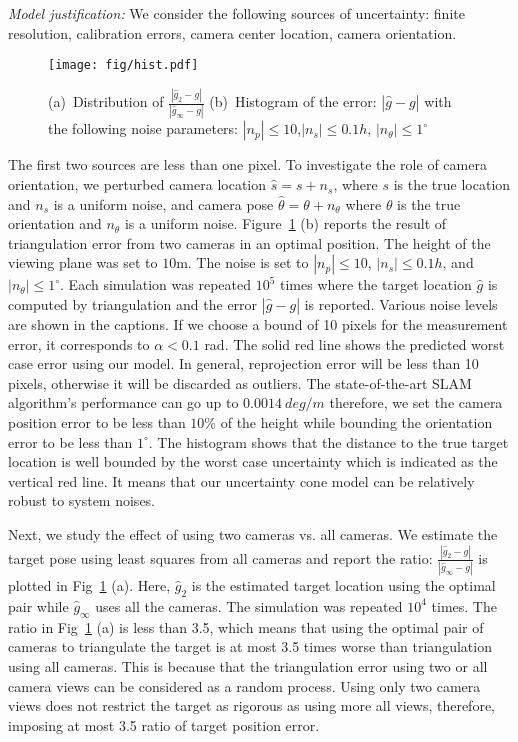 {\em Model justification:}
We consider the following sources of uncertainty: finite resolution, calibration errors, camera center location, camera orientation.

\begin{figure}
\centering
	\texttt{[image: fig/hist.pdf]}
	\caption{(a)~Distribution of  $\frac{|\hat{g}_2-g|}{|\hat{g}_\infty-g|}$ (b)~Histogram of the error: $|\hat{g}-g|$ with the following noise parameters: $|n_p| \leq 10$,$|n_s| \leq 0.1h$, $|n_\theta|\leq 1^\circ$}
	\label{fig:hist}
\end{figure}

The first two sources are less than one pixel. To investigate the role of camera orientation, we perturbed camera location
$\hat{s} = s + n_s$, where $s$ is the true location and $n_s$ is a uniform noise, and camera pose $\hat{\theta} = \theta + n_\theta$ where $\theta$ is the true orientation and $n_\theta $ is a uniform noise. Figure~\ref{fig:hist} (b) reports the result of triangulation error from two cameras in an optimal position. The height of the viewing plane was set to $10$m. The noise is set to $|n_p| \leq 10$, $|n_s| \leq 0.1h$, and $|n_\theta| \leq 1^\circ$. Each simulation was repeated $10^5$ times where the target location $\hat{g}$  is computed by triangulation and the error $|\hat{g}-g|$ is reported. Various noise levels are shown in the captions.
If we choose a bound of 10 pixels for the measurement error, it corresponds to  $\alpha < 0.1$ rad. The solid red line shows the predicted worst case error using our model. In general, reprojection error will be less than 10 pixels, otherwise it will be discarded as outliers. The state-of-the-art SLAM~\cite{zhang2015visual} algorithm's performance can go up to $0.0014 \ deg/m$ therefore, we set the camera position error to be less than $10 \%$ of the height while bounding the orientation error to be less than $1^\circ$. 
The histogram shows that the distance to the true target location is well bounded by the worst case uncertainty which is indicated as the vertical red line. It means that our uncertainty cone model can be relatively robust to system noises. 

Next, we study the effect of using two cameras vs. all cameras. 
We estimate the target pose using least squares from all cameras and report the ratio:
$\frac{|\hat{g}_2-g|}{|\hat{g}_\infty-g|}$ is plotted in Fig~\ref{fig:hist} (a). Here, $\hat{g}_2$ is the estimated target location using the optimal pair while $\hat{g}_\infty$ uses all the cameras. The simulation was repeated $10^4$ times. 
The ratio in Fig~\ref{fig:hist} (a) is less than 3.5, which means that using the optimal pair of cameras to triangulate the target is at most 3.5 times worse than triangulation using all cameras. This is because that the triangulation error using two or all camera views can be considered as a random process. Using only two camera views does not restrict the target as rigorous as using more all views, therefore, imposing at most 3.5 ratio of target position error.

